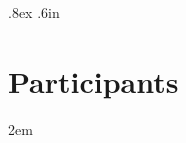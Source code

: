 \pagestyle{myheadings}

%

\makeatletter
\makeatother

{
\parindent 0pt
\parskip .8ex
\columnsep .6in

\thispagestyle{plain}
\section*{\Large\bfseries Participants}
\thispagestyle{plain}
\begin{flushleft}

\end{flushleft}
\parindent 2em
}

